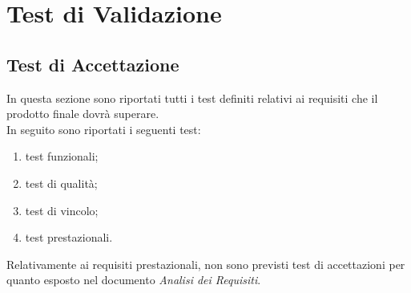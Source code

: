 \section{Test di Validazione}

\subsection{Test di Accettazione}
	In questa sezione sono riportati tutti i test definiti relativi ai requisiti che il prodotto finale dovrà superare.\\
	In seguito sono riportati i seguenti test:
	\begin{enumerate}
		\item test funzionali;
		\item test di qualità;
		\item test di vincolo;
		\item test prestazionali.
	\end{enumerate}
	Relativamente ai requisiti prestazionali, non sono previsti test di accettazioni per quanto esposto nel documento \textit{Analisi dei Requisiti}.
	
	
	
	\pagebreak
	